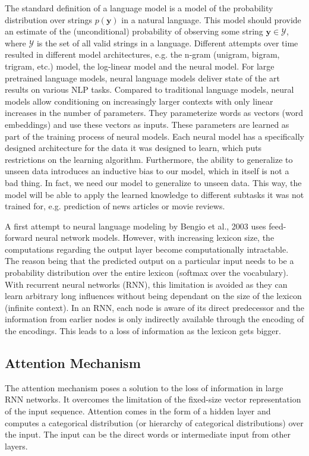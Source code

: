 The standard definition of a language model is a model of the probability distribution over strings $p(\mathbf{y})$ in a natural language. This model should provide an estimate of the (unconditional) probability of observing some string $\mathbf{y} \in\mathcal{Y}$, where $\mathcal{Y}$ is the set of all valid strings in a language. Different attempts over time resulted in different model architectures, e.g. the n-gram (unigram, bigram, trigram, etc.) model, the log-linear model and the neural model. For large pretrained language models, neural language models deliver state of the art results on various NLP tasks. Compared to traditional language models, neural models allow conditioning on increasingly larger contexts with only linear increases in the number of parameters. They parameterize words as vectors (word embeddings) and use these vectors as inputs. These parameters are learned as part of the training process of neural models. Each neural model has a specifically designed architecture for the data it was designed to learn, which puts restrictions on the learning algorithm. Furthermore, the ability to generalize to unseen data introduces an inductive bias to our model, which in itself is not a bad thing. In fact, we need our model to generalize to unseen data. This way, the model will be able to apply the learned knowledge to different subtasks it was not trained for, e.g. prediction of news articles or movie reviews.

A first attempt to neural language modeling by Bengio et al., 2003 \cite{bengio2003neural} uses feed-forward neural network models. However, with increasing lexicon size, the computations regarding the output layer become computationally intractable. The reason being that the predicted output on a particular input needs to be a probability distribution over the entire lexicon (softmax over the vocabulary). With recurrent neural networks (RNN), this limitation is avoided as they can learn arbitrary long influences without being dependant on the size of the lexicon (infinite context). In an RNN, each node is aware of its direct predecessor and the information from earlier nodes is only indirectly available through the encoding of the encodings. This leads to a loss of information as the lexicon gets bigger.

\subsection{Attention Mechanism}
The attention mechanism poses a solution to the loss of information in large RNN networks. It overcomes the limitation of the fixed-size vector representation of the input sequence. Attention comes in the form of a hidden layer and computes a categorical distribution (or hierarchy of categorical distributions) over the input. The input can be the direct words or intermediate input from other layers. \cite{kim2017structured}

